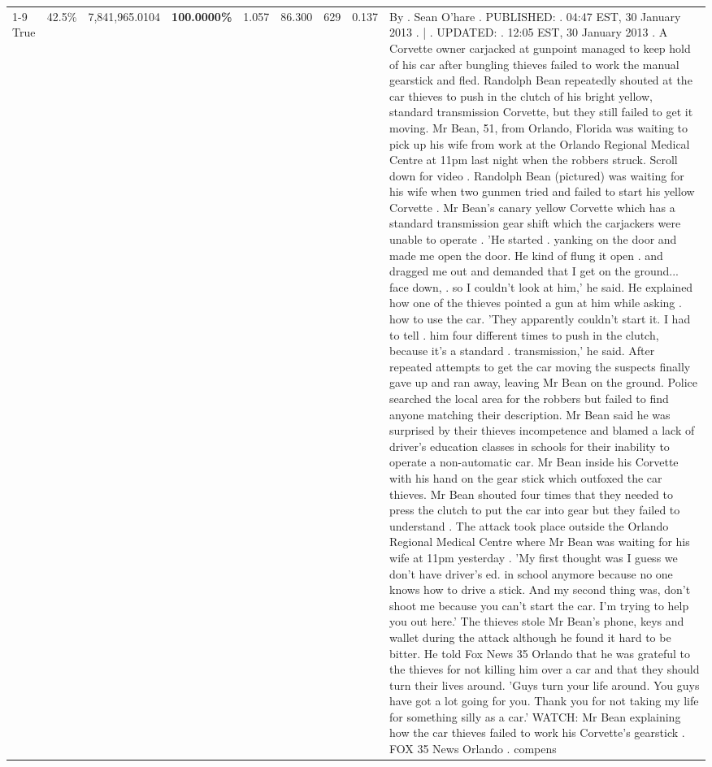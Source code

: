 \begin{table}[H]
\begin{tabular}{lllrlllll}
\cline{1-9} \cline{2-9}
True & 42.5\% & 7,841,965.0104 & \bfseries \color{red} 100.0000\% & 1.057 & 86.300 & 629 & 0.137 & By . Sean O'hare . PUBLISHED: . 04:47 EST, 30 January 2013 . | . UPDATED: . 12:05 EST, 30 January 2013 . A Corvette owner carjacked at gunpoint managed to keep hold of his car after bungling thieves failed to work the manual gearstick and fled. Randolph Bean repeatedly shouted at the car thieves to push in the clutch of his bright yellow, standard transmission Corvette, but they still failed to get it moving. Mr Bean, 51, from Orlando, Florida was waiting to pick up his wife from work at the Orlando Regional Medical Centre at 11pm last night when the robbers struck. Scroll down for video . Randolph Bean (pictured) was waiting for his wife when two gunmen tried and failed to start his yellow Corvette . Mr Bean's canary yellow Corvette which has a standard transmission gear shift which the carjackers were unable to operate . 'He started . yanking on the door and made me open the door. He kind of flung it open . and dragged me out and demanded that I get on the ground... face down, . so I couldn't look at him,' he said. He explained how one of the thieves pointed a gun at him while asking . how to use the car. 'They apparently couldn't start it. I had to tell . him four different times to push in the clutch, because it's a standard . transmission,' he said. After repeated attempts to get the car moving the suspects finally gave up and ran away, leaving Mr Bean on the ground. Police searched the local area for the robbers but failed to find anyone matching their description. Mr Bean said he was surprised by their thieves incompetence and blamed a lack of driver's education classes in schools for their inability to operate a non-automatic car. Mr Bean inside his Corvette with his hand on the gear stick which outfoxed the car thieves. Mr Bean shouted four times that they needed to press the clutch to put the car into gear but they failed to understand . The attack took place outside the Orlando Regional Medical Centre where Mr Bean was waiting for his wife at 11pm yesterday . 'My first thought was I guess we don't have driver's ed. in school anymore because no one knows how to drive a stick. And my second thing was, don't shoot me because you can't start the car. I'm trying to help you out here.' The thieves stole Mr Bean's phone, keys and wallet during the attack although he found it hard to be bitter. He told Fox News 35 Orlando that he was grateful to the thieves for not killing him over a car and that they should turn their lives around. 'Guys turn your life around. You guys have got a lot going for you. Thank you for not taking my life for something silly as a car.' WATCH: Mr Bean explaining how the car thieves failed to work his Corvette's gearstick . FOX 35 News Orlando . compens \\

\end{tabular}
\end{table}
